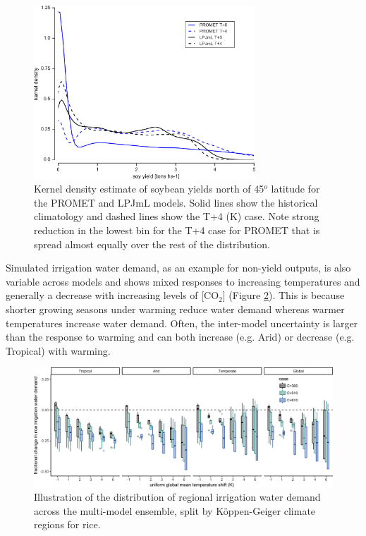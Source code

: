 \documentclass[gmd, manuscript]{copernicus} %
\begin{document}
\begin{figure}[ht]
\centering
   \includegraphics[width=8.3cm]{figures/testhighlatskde.png}
\caption{Kernel density estimate of soybean yields north of 45$^o$ latitude for the PROMET and LPJmL models. Solid lines show the historical climatology and dashed lines show the T+4 (K) case. Note strong reduction in the lowest bin for the T+4 case for PROMET that is spread almost equally over the rest of the distribution.}
\label{fig:highlat}
\end{figure}

Simulated irrigation water demand, as an example for non-yield outputs, is also variable across models and shows mixed responses to increasing temperatures and generally a decrease with increasing levels of [CO$_2$] (Figure \ref{fig:globesim_IRR}). 
This is because shorter growing seasons under warming reduce water demand whereas warmer temperatures increase water demand. Often, the inter-model uncertainty is larger than the response to warming and can both increase (e.g. Arid) or decrease (e.g. Tropical) with warming.

\begin{figure}[ht]
\centering
   \includegraphics[width=14cm]{figures/rice_sim_CG_irrwat.png}
   \caption{Illustration of the distribution of regional irrigation water demand across the multi-model ensemble, split by K\"{o}ppen-Geiger climate regions for rice.}
   \label{fig:globesim_IRR}
\end{figure}
\end{document}

